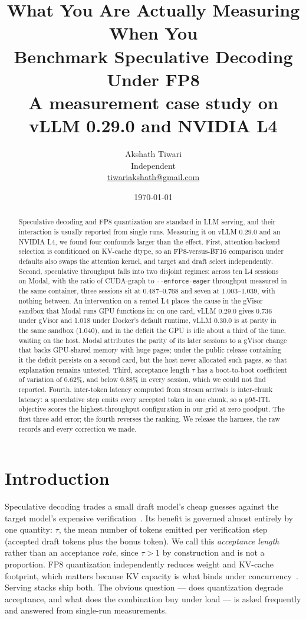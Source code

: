 \documentclass[11pt]{article}
\title{\bfseries What You Are Actually Measuring When You\\Benchmark Speculative Decoding Under FP8\\[0.3em]
\large\normalfont A measurement case study on vLLM 0.29.0 and NVIDIA L4}
\author{%
  Akshath Tiwari\\
  \small Independent\\
  \small \href{mailto:tiwariakshath@gmail.com}{tiwariakshath@gmail.com}
}
\date{\today}
\newcommand{\tw}[1]{\texttt{\small #1}}
\begin{document}
\maketitle

\begin{abstract}
\noindent
Speculative decoding and FP8 quantization are standard in LLM serving, and
their interaction is usually reported from single runs. Measuring it on
vLLM 0.29.0 and an NVIDIA L4, we found four confounds larger than the effect.
First, attention-backend selection is conditioned on KV-cache dtype, so an
FP8-versus-BF16 comparison under defaults also swaps the attention kernel,
and target and draft select independently. Second, speculative throughput
falls into two disjoint regimes: across ten L4 sessions on Modal, with the
ratio of CUDA-graph to \tw{-{}-enforce-eager} throughput measured in the same
container, three sessions sit at 0.487--0.768 and seven at 1.003--1.039, with
nothing between. An intervention on a rented L4 places the cause in the gVisor
sandbox that Modal runs GPU functions in: on one card, vLLM 0.29.0 gives
0.736 under gVisor and 1.018 under Docker's default runtime, vLLM 0.30.0 is
at parity in the same sandbox (1.040), and in the deficit the GPU is idle
about a third of the time, waiting on the host. Modal attributes the
parity of its later sessions to a gVisor change that backs GPU-shared memory
with huge pages; under the public release containing it the deficit
persists on a second card, but the host never allocated such pages, so that
explanation remains untested.
Third, acceptance length $\tau$ has a boot-to-boot coefficient of variation
of 0.62\%, and below 0.88\% in every session, which we could not find
reported. Fourth, inter-token latency computed from stream arrivals is
inter-chunk latency: a speculative step emits every accepted token in one
chunk, so a p95-ITL objective scores the highest-throughput configuration in
our grid at zero goodput. The first three add error; the fourth reverses the
ranking. We release the harness, the raw records and every correction we
made.
\end{abstract}

\section{Introduction}

Speculative decoding trades a small draft model's cheap guesses against the
target model's expensive verification~\cite{leviathan2023,chen2023}. Its
benefit is governed almost entirely by one quantity: $\tau$, the mean number
of tokens emitted per verification step (accepted draft tokens plus the
bonus token). We call this \emph{acceptance length} rather than an
acceptance \emph{rate}, since $\tau > 1$ by construction and is not a
proportion. FP8 quantization independently
reduces weight and KV-cache footprint, which matters because KV capacity is
what binds under concurrency~\cite{kwon2023}. Serving stacks ship both. The
obvious question --- does quantization degrade acceptance, and what does the
combination buy under load --- is asked frequently and answered from
single-run measurements.
\end{document}
